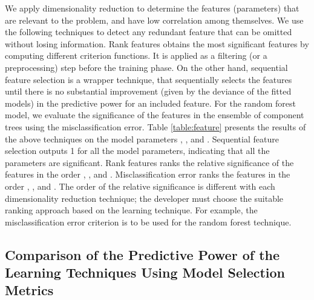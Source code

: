 \documentclass[conference]{IEEEtran}
\begin{document}
We apply dimensionality reduction \cite{Flach:2012:MLA:2490546} to determine the features (parameters) that are relevant to the problem, and have  low correlation among themselves. We use the following techniques to detect any redundant feature that can be omitted without losing information. Rank features obtains the most significant features by computing  different criterion functions. It is applied as a filtering (or a preprocessing) step before the training phase. On the other hand, sequential feature selection is a wrapper technique, that sequentially selects the features until there is no substantial improvement (given by the deviance of the fitted models) in the predictive power for an included feature. For the random forest model, we evaluate the significance of the features in the ensemble of component trees using the misclassification error. Table \ref{table:feature} presents the results of the above techniques on the model parameters  , , and . Sequential feature selection outputs 1 for all the model parameters, indicating  that all the parameters are significant. Rank features ranks the relative significance of the features in the order , , and . Misclassification error ranks the features in the order , , and . The order of the relative significance is different with each dimensionality reduction technique; the developer must choose the suitable ranking approach based on the learning technique. For example, the misclassification error criterion is to be used for the random forest technique.

\subsection{Comparison of the Predictive Power of the Learning Techniques Using Model Selection Metrics}\label{sec:compare}
\end{document}

